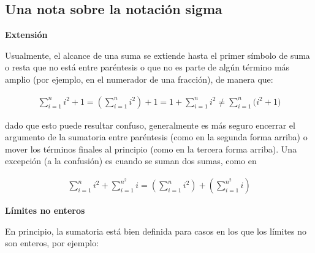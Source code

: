 
\subsection*{Una nota sobre la notación sigma}




\textbf{Extensión}

Usualmente, el alcance de una suma se extiende hasta el primer símbolo de suma o resta que no está entre paréntesis o que no es parte de algún término más amplio (por ejemplo, en el numerador de una fracción), de manera que:

\begin{align*}
  \sum_{i=1}^{n} i^2 + 1 = \left(\sum_{i=1}^{n}i^2\right) + 1 = 1 + \sum_{i=1}^{n} i^2 \neq \sum_{i=1}^{n} \bigl(i^2+1\bigr)
\end{align*}

dado que esto puede resultar confuso, generalmente es más seguro encerrar el argumento de la sumatoria entre paréntesis (como en la segunda forma arriba) o mover los términos finales al principio (como en la tercera forma arriba). Una excepción (a la confusión) es cuando se suman dos sumas, como en

\begin{align*}
  \sum_{i=1}^{n} i^2 + \sum_{i=1}^{n^2} i = \left(\sum_{i=1}^{n}i^2\right) + \left(\sum_{i=1}^{n^2}i\right)
\end{align*}

\textbf{Límites no enteros}

En principio, la sumatoria está bien definida para casos en los que los límites no son enteros, por ejemplo:

